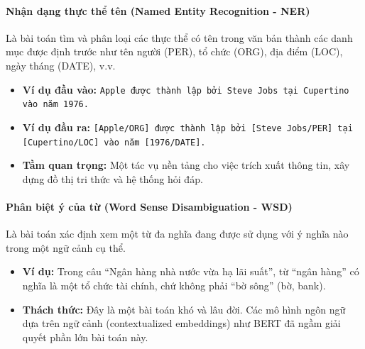 \paragraph{Nhận dạng thực thể tên (Named Entity Recognition - NER)}
Là bài toán tìm và phân loại các thực thể có tên trong văn bản thành các danh mục được định trước như tên người (PER), tổ chức (ORG), địa điểm (LOC), ngày tháng (DATE), v.v.
\begin{itemize}
    \item \textbf{Ví dụ đầu vào:} \texttt{Apple được thành lập bởi Steve Jobs tại Cupertino vào năm 1976.}
    \item \textbf{Ví dụ đầu ra:} \texttt{[Apple/ORG] được thành lập bởi [Steve Jobs/PER] tại [Cupertino/LOC] vào năm [1976/DATE].}
    \item \textbf{Tầm quan trọng:} Một tác vụ nền tảng cho việc trích xuất thông tin, xây dựng đồ thị tri thức và hệ thống hỏi đáp.
\end{itemize}

\paragraph{Phân biệt ý của từ (Word Sense Disambiguation - WSD)}
Là bài toán xác định xem một từ đa nghĩa đang được sử dụng với ý nghĩa nào trong một ngữ cảnh cụ thể.
\begin{itemize}
    \item \textbf{Ví dụ:} Trong câu “Ngân hàng nhà nước vừa hạ lãi suất”, từ “ngân hàng” có nghĩa là một tổ chức tài chính, chứ không phải “bờ sông” (bờ, bank).
    \item \textbf{Thách thức:} Đây là một bài toán khó và lâu đời. Các mô hình ngôn ngữ dựa trên ngữ cảnh (contextualized embeddings) như BERT đã ngầm giải quyết phần lớn bài toán này.
\end{itemize}

